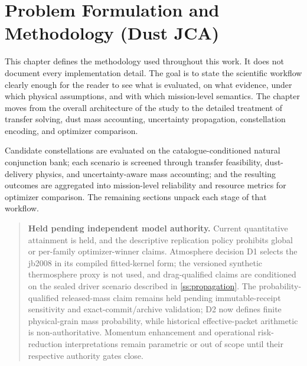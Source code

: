 \chapter{Problem Formulation and Methodology (Dust JCA)} \label{ch:methods}
    This chapter defines the methodology used throughout this work. It does not document every implementation detail. The goal is to state the scientific workflow clearly enough for the reader to see what is evaluated, on what evidence, under which physical assumptions, and with which mission-level semantics. The chapter moves from the overall architecture of the study to the detailed treatment of transfer solving, dust mass accounting, uncertainty propagation, constellation encoding, and optimizer comparison.

    Candidate constellations are evaluated on the catalogue-conditioned natural conjunction bank; each scenario is screened through transfer feasibility, dust-delivery physics, and uncertainty-aware mass accounting; and the resulting outcomes are aggregated into mission-level reliability and resource metrics for optimizer comparison. The remaining sections unpack each stage of that workflow.

    \begin{quote}
    \textbf{Held pending independent model authority.} Current quantitative attainment is held, and the descriptive replication policy prohibits global or per-family optimizer-winner claims. Atmosphere decision D1 selects the \gls{jb2008} in its compiled fitted-kernel form; the versioned synthetic thermosphere proxy is not used, and drag-qualified claims are conditioned on the sealed driver scenario described in \cref{ss:propagation}. The probability-qualified released-mass claim remains held pending immutable-receipt sensitivity and exact-commit/archive validation; D2 now defines finite physical-grain mass probability, while historical effective-packet arithmetic is non-authoritative. Momentum enhancement and operational risk-reduction interpretations remain parametric or out of scope until their respective authority gates close.
    \end{quote}

